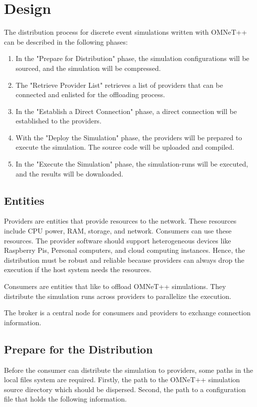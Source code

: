 \chapter{Design}

The distribution process for discrete event simulations written with OMNeT++ can be described in the following phases:
\begin{enumerate}
    \item In the "Prepare for Distribution" phase, the simulation configurations will be sourced, and the simulation will be compressed.

    \item The "Retrieve Provider List" retrieves a list of providers that can be connected and enlisted for the offloading process.

    \item In the "Establish a Direct Connection" phase, a direct connection will be established to the providers.

    \item With the "Deploy the Simulation" phase, the providers will be prepared to execute the simulation. The source code will be uploaded and compiled.

    \item In the "Execute the Simulation" phase, the simulation-runs will be executed, and the results will be downloaded.
\end{enumerate}

\section{Entities}
Providers are entities that provide resources to the network. These resources include CPU power, RAM, storage, and network. Consumers can use these resources. The provider software should support heterogeneous devices like Raspberry Pis, Personal computers, and cloud computing instances. Hence, the distribution must be robust and reliable because providers can always drop the execution if the host system needs the resources.

Consumers are entities that like to offload OMNeT++ simulations. They distribute the simulation runs across providers to parallelize the execution.

The broker is a central node for consumers and providers to exchange connection information.

\section{Prepare for the Distribution}
Before the consumer can distribute the simulation to providers, some paths in the local files system are required. Firstly, the path to the OMNeT++ simulation source directory which should be dispersed. Second, the path to a configuration file that holds the following information.

